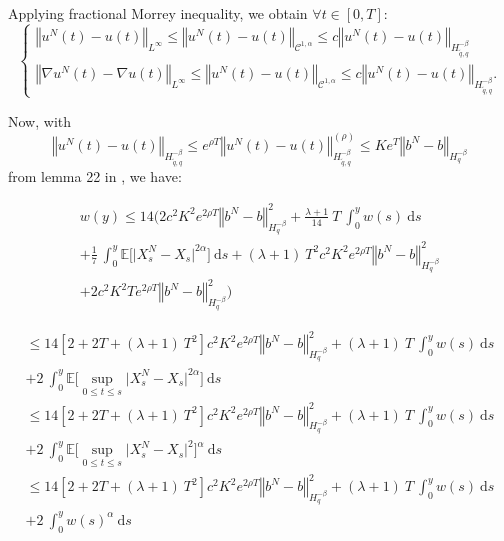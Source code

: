 \documentclass{article}[12pt]
\newcommand{\norme}[1]{\left\Vert #1\right\Vert}
\newcommand{\E}{\mathbb{E}}
\newcommand{\di}{\mathrm{d}}
\begin{document}
        Applying fractional Morrey inequality, we obtain $\forall t\in[0,T]$:
        \begin{equation*}
        \begin{cases}
        \norme{u^N(t) - u(t)}_{L^\infty}\leq\norme{u^N(t) - u(t)}_{\mathcal{C}^{1,\alpha}}\leq c\norme{u^N(t)-u(t)}_{H^{-\beta}_{\tilde{q},q}}\\        
        \norme{\nabla u^N(t) - \nabla u(t)}_{L^\infty}\leq\norme{u^N(t) - u(t)}_{\mathcal{C}^{1,\alpha}}\leq c\norme{u^N(t)-u(t)}_{H^{-\beta}_{\tilde{q},q}}.
        \end{cases}        
        \end{equation*}
        
        Now, with
        \begin{equation*}
        \norme{u^N(t)-u(t)}_{H^{-\beta}_{\tilde{q},q}}\leq e^{\rho T} \norme{u^N(t)-u(t)}_{H^{-\beta}_{\tilde{q},q}}^{(\rho)}\leq Ke^T\norme{b^N-b}_{H^{-\beta}_{q}}
        \end{equation*} from lemma 22 in \cite{Fla-Iss-Rus-2017}, we have:
        
        \begin{multline*}
        w(y)
        \leq 14\Bigg(2c^2K^2e^{2\rho T}\norme{b^N-b}_{H^{-\beta}_{q}}^2 + \frac{\lambda+1}{14}\ T\ \int_0^y w(s)\ \di s\\+\frac{1}{7}\ \int_0^y\E\bigg[ \Big|X_s^N - X_s\Big|^{2\alpha}\bigg]\ \di s + (\lambda+1)\ T^2 c^2K^2e^{2\rho T}\norme{b^N-b}_{H^{-\beta}_{q}}^2\\ +2c^2K^2Te^{2\rho T}\norme{b^N-b}_{H^{-\beta}_{q}}^2 \Bigg)
        \end{multline*}
        
        \begin{multline*}
        \leq 14\left[2 + 2T + (\lambda+1)\ T^2\right] c^2K^2e^{2\rho T}\norme{b^N-b}_{H^{-\beta}_{q}}^2  +
        (\lambda+1)\ T\ \int_0^y w(s)\ \di s\\+2\ \int_0^y\E\bigg[ \underset{0\leq t\leq s}{\sup}\big|X_s^N - X_s\big|^{2\alpha}\bigg]\ \di s
        \end{multline*}        
        \begin{multline*}
        \leq 14\left[2 + 2T + (\lambda+1)\ T^2\right] c^2K^2e^{2\rho T}\norme{b^N-b}_{H^{-\beta}_{q}}^2  +
        (\lambda+1)\ T\ \int_0^y w(s)\ \di s\\+2\ \int_0^y\E\bigg[ \underset{0\leq t\leq s}{\sup}\big|X_s^N - X_s\big|^{2}\bigg]^\alpha\ \di s
        \end{multline*}
        \begin{multline*}
        \leq 14\left[2 + 2T + (\lambda+1)\ T^2\right] c^2K^2e^{2\rho T}\norme{b^N-b}_{H^{-\beta}_{q}}^2  +
        (\lambda+1)\ T\ \int_0^y w(s)\ \di s\\+2\ \int_0^y w(s)^\alpha\ \di s
        \end{multline*}
        
\end{document}

